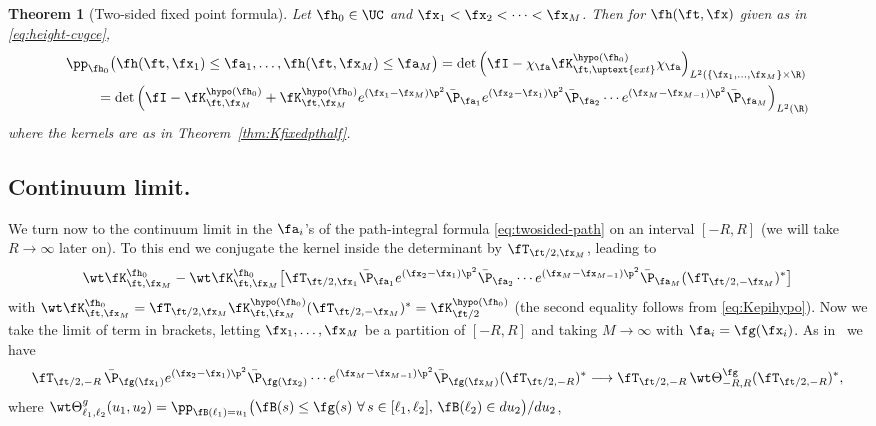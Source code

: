 \documentclass[]{pcmi}
\theoremstyle{plain}
\newtheorem{theorem}[equation]{Theorem}
\theoremstyle{definition}
\begin{document}
\begin{theorem}[Two-sided fixed point formula]\label{thm:two-sided-lim-extended}
Let $\fh_0\in \UC$  and $\fx_1<\fx_2<\dotsm<\fx_M$.
Then for $\fh(\ft,\fx)$ given as in \eqref{eq:height-cvgce},
\begin{align}
&\pp_{\fh_0}\bigl(\fh(\ft,\fx_1)\leq\fa_1,\ldots,\fh(\ft,\fx_M)\leq\fa_M\bigr) =\det\left(\fI-\chi_{\fa}\fK^{\hypo(\fh_0)}_{\ft,\uptext{ext}}\chi_{\fa}\right)_{L^2(\{\fx_1,\ldots,\fx_M\}\times\R)}\label{eq:twosided-ext}\\
&\hspace{0.3in}=\det\left(\fI-\fK^{\hypo(\fh_0)}_{\ft,\fx_M}+\fK^{\hypo(\fh_0)}_{\ft,\fx_M} e^{(\fx_1-\fx_M)\p^2}\bar\P_{\fa_1}e^{(\fx_2-\fx_1)\p^2}\bar\P_{\fa_2}\dotsm e^{(\fx_M-\fx_{M-1})\p^2}\bar\P_{\fa_M}\right)_{L^2(\R)}\label{eq:twosided-path}
\end{align}
where the kernels are as in Theorem~\ref{thm:Kfixedpthalf}.
\end{theorem}

\subsection{Continuum limit.}\label{sec:continuumfixedpt}

We turn now to the continuum limit in the $\fa_i$'s of the path-integral formula \eqref{eq:twosided-path} on an interval $[-R,R]$ (we will take $R\to\infty$ later on).
To this end we conjugate the kernel inside the determinant by $\fT_{\ft/2,\fx_M}$, leading to
\[\wt\fK^{\fh_0}_{\ft,\fx_M}-\wt\fK^{\fh_0}_{\ft,\fx_M}\big[\fT_{\ft/2,\fx_1}\bar\P_{\fa_1}e^{(\fx_2-\fx_1)\p^2}\bar\P_{\fa_2}\dotsm e^{(\fx_M-\fx_{M-1})\p^2}\bar\P_{\fa_M}(\fT_{\ft/2,-\fx_M})^*\big]\]
with $\wt\fK^{\fh_0}_{\ft,\fx_M}=\fT_{\ft/2,\fx_M}\fK^{\hypo(\fh_0)}_{\ft,\fx_M}(\fT_{\ft/2,-\fx_M})^*=\fK^{\hypo(\fh_0)}_{\ft/2}$ (the second equality follows from \eqref{eq:Kepihypo}).
Now we take the limit of term in brackets, letting $\fx_1,\ldots,\fx_M$ be a partition of $[-R,R]$ and taking $M\to\infty$ with $\fa_i=\fg(\fx_i)$.
As in~\cite{cqr} we have
\[
\fT_{\ft/2,-R}\,\bar\P_{\fg(\fx_1)}e^{(\fx_2-\fx_1)\p^2}\bar\P_{\fg(\fx_2)}\dotsm e^{(\fx_M-\fx_{M-1})\p^2}\bar\P_{\fg(\fx_M)}(\fT_{\ft/2,-R})^*
\longrightarrow\fT_{\ft/2,-R}\,\wt\Theta^{\fg}_{-R,R}(\fT_{\ft/2,-R})^*,\label{eq:continuumLimit}
\]
where $\wt\Theta^g_{\ell_1,\ell_2}(u_1,u_2)=\pp_{\fB(\ell_1)=u_1}\big(\fB(s)\leq\fg(s)~\forall\,s\in[\ell_1,\ell_2],\,\fB(\ell_2)\in du_2\big)/du_2$,
\end{document}
